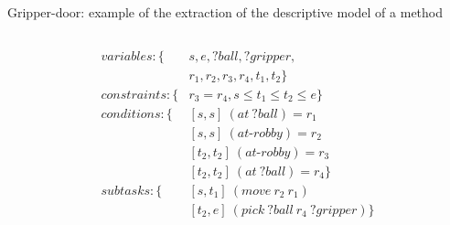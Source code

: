 \begin{frame}[c,fragile]{Gripper-door: example of the extraction of the descriptive model of a method}
\begin{columns}[c, T]
\begin{column}{0.32\textwidth}
\tiny
\begin{align*}
    variables: \{&s,e,?ball,?gripper,\\
    &r_1,r_2,r_3,r_4,t_1,t_2\} \\
    constraints : \{ &r_3 = r_4, s \leq t_1 \leq t_2 \leq e \}\\
    conditions : \{&[s,s]~(at\ ?ball) = r_1 \\
        &[s,s]~(at\text{-}robby) = r_2 \\
        &[t_2,t_2]~(at\text{-}robby) = r_3 \\
        &[t_2,t_2]~(at\ ?ball) = r_4 \} \\
    subtasks : \{ &[s,t_1]~(move\ r_2\ r_1) \\
        &[t_2,e]~(pick\ ?ball\ r_4\ ?gripper)\}
\end{align*}  
        \end{column}
    \end{columns}
\end{frame}



